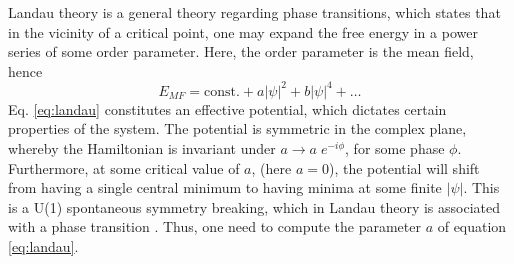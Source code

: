Landau theory is a general theory regarding phase transitions, which states that in the vicinity of a critical point, one may expand the free energy in a power series of some order parameter. Here, the order parameter is the mean field, hence
\begin{equation}
	E_{MF} = \text{const.} + a |\psi|^2 + b |\psi|^4 + \ldots \label{eq:landau}
\end{equation} 
Eq. \eqref{eq:landau} constitutes an effective potential, which dictates certain properties of the system.
The potential is symmetric in the complex plane, whereby the Hamiltonian is invariant under $a \to a \; e^{-i \phi}$, for some phase $\phi$. Furthermore, at some critical value of $a$, (here $a = 0$), the potential will shift from having a single central minimum to having minima at some finite $|\psi|$. This is a U(1) spontaneous symmetry breaking, which in Landau theory is associated with a phase transition \cite{plischke}. Thus, one need to compute the parameter $a$ of equation \eqref{eq:landau}.

